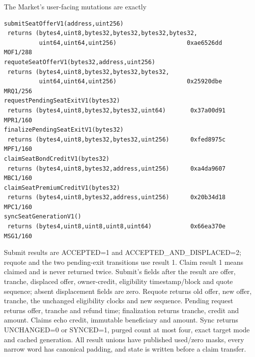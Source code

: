 \documentclass[a4paper,11pt]{article}
\begin{document}
The Market's user-facing mutations are exactly
\begin{verbatim}
submitSeatOfferV1(address,uint256)
 returns (bytes4,uint8,bytes32,bytes32,bytes32,bytes32,
          uint64,uint64,uint256)                    0xae6526dd MOF1/288
requoteSeatOfferV1(bytes32,address,uint256)
 returns (bytes4,uint8,bytes32,bytes32,bytes32,
          uint64,uint64,uint256)                    0x25920dbe MRQ1/256
requestPendingSeatExitV1(bytes32)
 returns (bytes4,uint8,bytes32,bytes32,uint64)       0x37a00d91 MPR1/160
finalizePendingSeatExitV1(bytes32)
 returns (bytes4,uint8,bytes32,bytes32,uint256)      0xfed8975c MPF1/160
claimSeatBondCreditV1(bytes32)
 returns (bytes4,uint8,bytes32,address,uint256)      0xa4da9607 MBC1/160
claimSeatPremiumCreditV1(bytes32)
 returns (bytes4,uint8,bytes32,address,uint256)      0x20b34d18 MPC1/160
syncSeatGenerationV1()
 returns (bytes4,uint8,uint8,uint8,uint64)           0x66ea370e MSG1/160
\end{verbatim}
Submit results are ACCEPTED=1 and ACCEPTED\_AND\_DISPLACED=2; requote and the
two pending-exit transitions use result 1.  Claim result 1 means claimed and is
never returned twice.  Submit's fields after the result are offer, tranche,
displaced offer, owner-credit, eligibility timestamp/block and quote sequence;
absent displacement fields are zero.  Requote returns old offer, new offer,
tranche, the unchanged eligibility clocks and new sequence.  Pending request
returns offer, tranche and refund time; finalization returns tranche, credit and
amount.  Claims echo credit, immutable beneficiary and amount.  Sync returns
UNCHANGED=0 or SYNCED=1, purged count at most four, exact target mode and
cached generation.  All result unions have published used/zero masks, every
narrow word has canonical padding, and state is written before a claim transfer.
\end{document}
